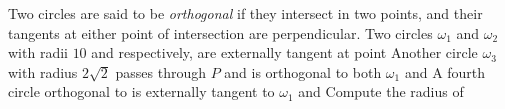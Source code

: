 Two circles are said to be \textit{orthogonal} if they intersect in two points, and their tangents at either point of intersection are perpendicular. Two circles $\omega_1$ and $\omega_2$ with radii $10$ and  respectively, are externally tangent at point  Another circle $\omega_3$ with radius $2\sqrt2$ passes through $P$ and is orthogonal to both $\omega_1$ and  A fourth circle  orthogonal to  is externally tangent to $\omega_1$ and  Compute the radius of 